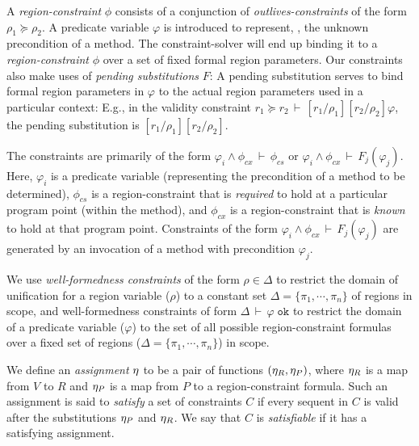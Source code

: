\documentclass[a4paper,UKenglish]{lipics-v2018}
\newcommand{\conj}{\wedge}
\newcommand{\tywf}[2]{#1\,\vdash\,#2 \; \texttt{ok}}
\newcommand{\isvalid}[2]{#1\,\vdash\,#2}
\newcommand{\outlives}{\succeq}
\newcommand{\rgn}{r}
\newcommand{\regionConstants}{R}
\newcommand{\regionVars}{V}
\newcommand{\predVars}{P}
\newcommand{\rhoenv}{\Delta}
\newcommand{\phictxt}{\phi_{cx}}
\newcommand{\phicstr}{\phi_{cs}}
\begin{document}
A \emph{region-constraint} $\phi$ consists of a conjunction of
\emph{outlives-constraints} of the form $\rho_1 \outlives \rho_2$.  A
predicate variable $\varphi$ is introduced to represent, \eg, the
unknown precondition of a method.  The constraint-solver will end up
binding it to a \emph{region-constraint} $\phi$ over a set of fixed
formal region parameters.  Our constraints also make uses of
\emph{pending substitutions} $F$: A pending substitution serves to
bind formal region parameters in $\varphi$ to the actual region
parameters used in a particular context: E.g., in the validity
constraint $\isvalid{\rgn_1 \outlives
\rgn_2}{[\rgn_1/\rho_1][\rgn_2/\rho_2]\varphi}$, the pending
substitution is $[\rgn_1/\rho_1][\rgn_2/\rho_2]$.

The constraints are primarily of the form $\isvalid{\varphi_i \conj
\phictxt} {\phicstr}$ or $\isvalid{\varphi_i \conj \phictxt}
{F_j(\varphi_j)}$.  Here, $\varphi_i$ is a predicate variable
(representing the precondition of a method to be determined),
$\phicstr$ is a region-constraint that is \emph{required} to hold at a
particular program point (within the method), and $\phictxt$ is a
region-constraint that is \emph{known} to hold at that program point.
Constraints of the form $\isvalid{\varphi_i \conj \phictxt}
{F_j(\varphi_j)}$ are generated by an invocation of a method with
precondition $\varphi_j$.

We use \emph{well-formedness constraints} of the form $\rho \in
\rhoenv$ to restrict the domain of unification for a region variable
($\rho$) to a constant set $\rhoenv = \{ \pi_1, \cdots, \pi_n \}$ of
regions in scope, and  well-formedness constraints of form
$\tywf{\rhoenv}{\varphi}$ to restrict the domain of a predicate
variable ($\varphi$) to the set of all possible region-constraint
formulas over a fixed set of  regions ($\rhoenv = \{ \pi_1, \cdots,
\pi_n \}$) in scope.

We define an \emph{assignment} $\eta$ to be a pair of functions
$(\eta_R,\eta_P)$, where $\eta_R$ is a map from $\regionVars$ to
$\regionConstants$ and $\eta_P$ is a map from $\predVars$ to a
region-constraint formula.  Such an assignment is said to
\emph{satisfy} a set of constraints $C$ if every sequent in $C$ is
valid after the substitutions $\eta_P$ and $ \eta_R$.  We say that $C$
is \emph{satisfiable} if it has a satisfying assignment.


\newcommand{\rulepart}[1]{%
\begingroup%
\renewcommand*{\arraystretch}{1.2}%
\begin{array}{c} #1 \end{array}%
\endgroup%
}
\end{document}
